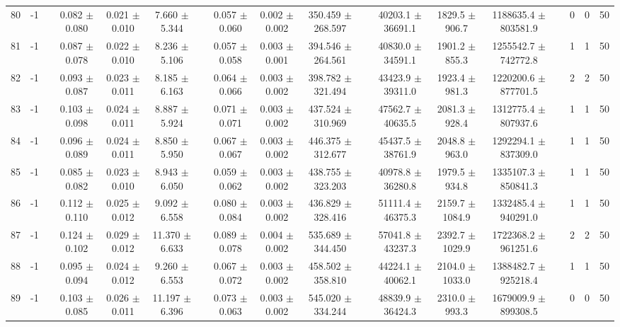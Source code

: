 \documentclass[11pt]{article}
\begin{document}
\begin{landscape}
\begin{table}
\begin{tabular}{cccccccccccccccccc}
80 &      -1 &&  0.082 $\pm$ 0.080 & 0.021 $\pm$ 0.010 & 7.660 $\pm$ 5.344 &&  0.057 $\pm$ 0.060 & 0.002 $\pm$ 0.002 & 350.459 $\pm$ 268.597 &&  40203.1 $\pm$ 36691.1 & 1829.5 $\pm$ 906.7 & 1188635.4 $\pm$ 803581.9 && 0& 0& 50\\
81 &      -1 &&  0.087 $\pm$ 0.078 & 0.022 $\pm$ 0.010 & 8.236 $\pm$ 5.106 &&  0.057 $\pm$ 0.058 & 0.003 $\pm$ 0.001 & 394.546 $\pm$ 264.561 &&  40830.0 $\pm$ 34591.1 & 1901.2 $\pm$ 855.3 & 1255542.7 $\pm$ 742772.8 && 1& 1& 50\\
82 &      -1 &&  0.093 $\pm$ 0.087 & 0.023 $\pm$ 0.011 & 8.185 $\pm$ 6.163 &&  0.064 $\pm$ 0.066 & 0.003 $\pm$ 0.002 & 398.782 $\pm$ 321.494 &&  43423.9 $\pm$ 39311.0 & 1923.4 $\pm$ 981.3 & 1220200.6 $\pm$ 877701.5 && 2& 2& 50\\
83 &      -1 &&  0.103 $\pm$ 0.098 & 0.024 $\pm$ 0.011 & 8.887 $\pm$ 5.924 &&  0.071 $\pm$ 0.071 & 0.003 $\pm$ 0.002 & 437.524 $\pm$ 310.969 &&  47562.7 $\pm$ 40635.5 & 2081.3 $\pm$ 928.4 & 1312775.4 $\pm$ 807937.6 && 1& 1& 50\\
84 &      -1 &&  0.096 $\pm$ 0.089 & 0.024 $\pm$ 0.011 & 8.850 $\pm$ 5.950 &&  0.067 $\pm$ 0.067 & 0.003 $\pm$ 0.002 & 446.375 $\pm$ 312.677 &&  45437.5 $\pm$ 38761.9 & 2048.8 $\pm$ 963.0 & 1292294.1 $\pm$ 837309.0 && 1& 1& 50\\
85 &      -1 &&  0.085 $\pm$ 0.082 & 0.023 $\pm$ 0.010 & 8.943 $\pm$ 6.050 &&  0.059 $\pm$ 0.062 & 0.003 $\pm$ 0.002 & 438.755 $\pm$ 323.203 &&  40978.8 $\pm$ 36280.8 & 1979.5 $\pm$ 934.8 & 1335107.3 $\pm$ 850841.3 && 1& 1& 50\\
86 &      -1 &&  0.112 $\pm$ 0.110 & 0.025 $\pm$ 0.012 & 9.092 $\pm$ 6.558 &&  0.080 $\pm$ 0.084 & 0.003 $\pm$ 0.002 & 436.829 $\pm$ 328.416 &&  51111.4 $\pm$ 46375.3 & 2159.7 $\pm$ 1084.9 & 1332485.4 $\pm$ 940291.0 && 1& 1& 50\\
87 &      -1 &&  0.124 $\pm$ 0.102 & 0.029 $\pm$ 0.012 & 11.370 $\pm$ 6.633 &&  0.089 $\pm$ 0.078 & 0.004 $\pm$ 0.002 & 535.689 $\pm$ 344.450 &&  57041.8 $\pm$ 43237.3 & 2392.7 $\pm$ 1029.9 & 1722368.2 $\pm$ 961251.6 && 2& 2& 50\\
88 &      -1 &&  0.095 $\pm$ 0.094 & 0.024 $\pm$ 0.012 & 9.260 $\pm$ 6.553 &&  0.067 $\pm$ 0.072 & 0.003 $\pm$ 0.002 & 458.502 $\pm$ 358.810 &&  44224.1 $\pm$ 40062.1 & 2104.0 $\pm$ 1033.0 & 1388482.7 $\pm$ 925218.4 && 1& 1& 50\\
89 &      -1 &&  0.103 $\pm$ 0.085 & 0.026 $\pm$ 0.011 & 11.197 $\pm$ 6.396 &&  0.073 $\pm$ 0.063 & 0.003 $\pm$ 0.002 & 545.020 $\pm$ 334.244 &&  48839.9 $\pm$ 36424.3 & 2310.0 $\pm$ 993.3 & 1679009.9 $\pm$ 899308.5 && 0& 0& 50\\

\end{tabular}
\end{table}
\end{landscape}
\end{document}
